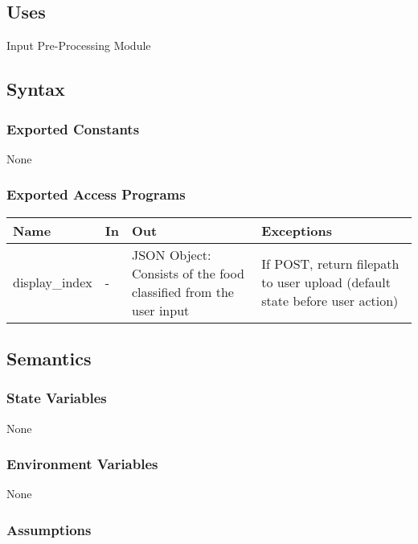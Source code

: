 \documentclass[12pt, titlepage]{article}
\begin{document}
\subsection{Uses}

Input Pre-Processing Module

\subsection{Syntax}

\subsubsection{Exported Constants}

None

\subsubsection{Exported Access Programs}

\begin{center}
\begin{tabular}{p{2.5cm} p{0.5cm} p{4.5cm} p{5cm}}
\hline
\textbf{Name} & \textbf{In} & \textbf{Out} & \textbf{Exceptions} \\
\hline
display\_index & - & JSON Object: Consists of the food classified from the user input & If POST, return filepath to user upload (default state before user action) \\
\hline
\end{tabular}
\end{center}

\subsection{Semantics}

\subsubsection{State Variables}

None

\subsubsection{Environment Variables}

None

\subsubsection{Assumptions}
\end{document}

